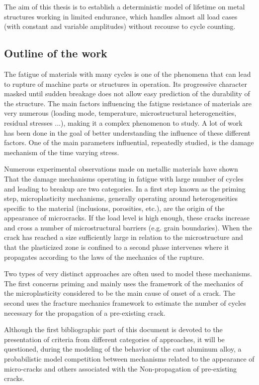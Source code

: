 \documentclass[3p,times,procedia,number]{elsarticle}
\begin{document}
The aim of this thesis is to establish a deterministic model of lifetime
on metal structures working in limited endurance, which handles almost all load cases
(with constant and variable amplitudes) without recourse to cycle counting.

\subsection{Outline of the work}
The fatigue of materials with many cycles is one of the phenomena that can lead to
rupture of machine parts or structures in operation. Its progressive character
masked until sudden breakage does not allow easy prediction of the durability of the
structure.
The main factors influencing the fatigue resistance of materials are very numerous
(loading mode, temperature, microstructural heterogeneities, residual stresses ...),
making it a complex phenomenon to study. A lot of work has been done in the goal of
better understanding the influence of these different factors. One of the main parameters
influential, repeatedly studied, is the damage mechanism of the time varying stress.

Numerous experimental observations made on metallic materials have shown
That the damage mechanisms operating in fatigue with large number of cycles and
leading to breakup are two categories. In a first step known as the priming step,
microplasticity mechanisms, generally operating around heterogeneities specific to the
material (inclusions, porosities, etc.), are the origin of the appearance of microcracks. If the load level is high enough, these cracks increase and cross a number of
microstructural barriers (e.g. grain boundaries). When the crack has reached a size
sufficiently large in relation to the microstructure and that the plasticized zone is confined to
a second phase intervenes where it propagates according to the laws of the
mechanics of the rupture.

Two types of very distinct approaches are often used to model these mechanisms. The
 first concerns priming and mainly uses the framework of the mechanics of the
microplasticity considered to be the main cause of onset
of a crack. The second uses the fracture mechanics framework to estimate the number
of cycles necessary for the propagation of a pre-existing crack. 

Although the first bibliographic part of this document is devoted to the presentation of
criteria from different categories of approaches, it will be questioned, during the modeling of the
behavior of the cast aluminum alloy, a probabilistic model
competition between mechanisms related to the appearance of micro-cracks and others associated with the
Non-propagation of pre-existing cracks.
\end{document}
